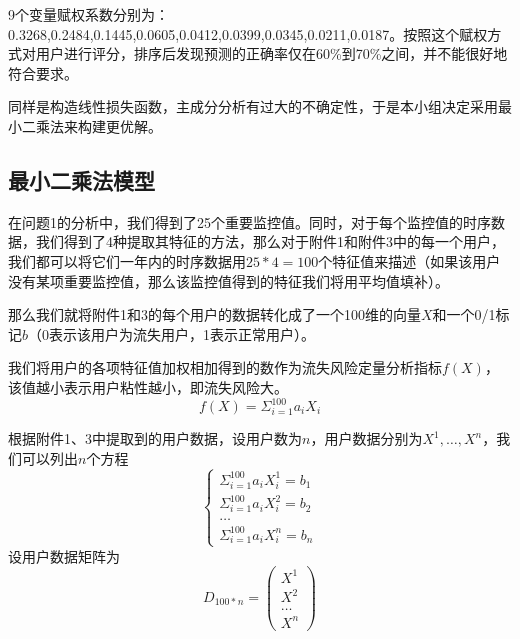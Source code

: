 \documentclass{ctexart}
\begin{document}
    9个变量赋权系数分别为：0.3268,0.2484,0.1445,0.0605,0.0412,0.0399,0.0345,0.0211,0.0187。按照这个赋权方式对用户进行评分，排序后发现预测的正确率仅在60\%到70\%之间，并不能很好地符合要求。

    同样是构造线性损失函数，主成分分析有过大的不确定性，于是本小组决定采用最小二乘法来构建更优解。

    \subsection{最小二乘法模型}

    在问题1的分析中，我们得到了25个重要监控值。同时，对于每个监控值的时序数据，我们得到了4种提取其特征的方法，那么对于附件1和附件3中的每一个用户，我们都可以将它们一年内的时序数据用$25*4=100$个特征值来描述（如果该用户没有某项重要监控值，那么该监控值得到的特征我们将用平均值填补）。

            那么我们就将附件1和3的每个用户的数据转化成了一个100维的向量$X$和一个0/1标记$b$（0表示该用户为流失用户，1表示正常用户）。

            我们将用户的各项特征值加权相加得到的数作为流失风险定量分析指标$f(X)$，该值越小表示用户粘性越小，即流失风险大。
            \[
                f(X)=\Sigma_{i=1}^{100}{a_i X_i}
            \]

            根据附件1、3中提取到的用户数据，设用户数为$n$，用户数据分别为$X^1,\dotsc,X^n$，我们可以列出$n$个方程
            \begin{equation}
                \begin{cases}
                \Sigma_{i=1}^{100}{a_i X^1_i}=b_1\\
                \Sigma_{i=1}^{100}{a_i X^2_i}=b_2\\
                \dotsc\\
                \Sigma_{i=1}^{100}{a_i X^n_i}=b_n
                \end{cases}
            \end{equation}
            设用户数据矩阵为
            \begin{equation}
                D_{100*n}=\begin{pmatrix}
                    X^1\\
                    X^2\\
                    \dotsc\\
                    X^n
                \end{pmatrix}
            \end{equation}
            
\end{document}
